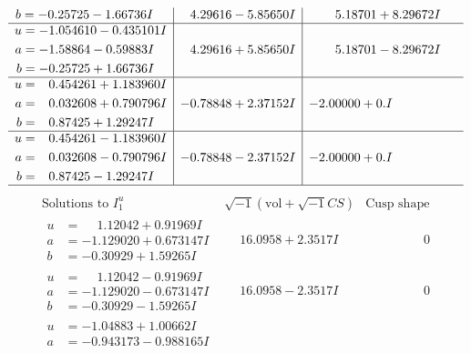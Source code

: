 \documentclass[1p]{elsarticle_modified}
\theoremstyle{definition}
\newcommand{\I}{\sqrt{-1}}
\begin{document}
$$\begin{array}{c|c|c}
\begin{aligned}
b &= -0.25725 - 1.66736 I\end{aligned}
 & \phantom{-}4.29616 - 5.85650 I & \phantom{-}5.18701 + 8.29672 I \\ \hline\begin{aligned}
u &= -1.054610 - 0.435101 I \\
a &= -1.58864 - 0.59883 I \\
b &= -0.25725 + 1.66736 I\end{aligned}
 & \phantom{-}4.29616 + 5.85650 I & \phantom{-}5.18701 - 8.29672 I \\ \hline\begin{aligned}
u &= \phantom{-}0.454261 + 1.183960 I \\
a &= \phantom{-}0.032608 + 0.790796 I \\
b &= \phantom{-}0.87425 + 1.29247 I\end{aligned}
 & -0.78848 + 2.37152 I & -2.00000 + 0. I\phantom{ +0.000000I} \\ \hline\begin{aligned}
u &= \phantom{-}0.454261 - 1.183960 I \\
a &= \phantom{-}0.032608 - 0.790796 I \\
b &= \phantom{-}0.87425 - 1.29247 I\end{aligned}
 & -0.78848 - 2.37152 I & -2.00000 + 0. I\phantom{ +0.000000I}\\
 \hline 
 \end{array}$$\newpage$$\begin{array}{c|c|c}  
\text{Solutions to }I^u_{1}& \I (\text{vol} + \sqrt{-1}CS) & \text{Cusp shape}\\
 \hline 
\begin{aligned}
u &= \phantom{-}1.12042 + 0.91969 I \\
a &= -1.129020 + 0.673147 I \\
b &= -0.30929 + 1.59265 I\end{aligned}
 & \phantom{-}16.0958 + 2.3517 I & \phantom{-0.000000 } 0 \\ \hline\begin{aligned}
u &= \phantom{-}1.12042 - 0.91969 I \\
a &= -1.129020 - 0.673147 I \\
b &= -0.30929 - 1.59265 I\end{aligned}
 & \phantom{-}16.0958 - 2.3517 I & \phantom{-0.000000 } 0 \\ \hline\begin{aligned}
u &= -1.04883 + 1.00662 I \\
a &= -0.943173 - 0.988165 I \\

\end{aligned}
\end{array}$$
\end{document}

